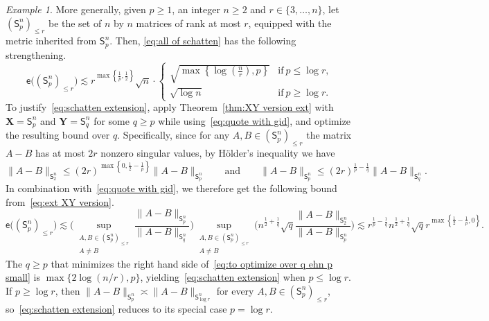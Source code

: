 \documentclass[11pt,reqno]{amsart}
\renewcommand{\le}{\leqslant}
\renewcommand{\ge}{\geqslant}
\newcommand{\X}{\mathbf X}
\newcommand{\Y}{\mathbf Y}
\theoremstyle{remark}
\newtheorem{example}[theorem]{Example}
\newcommand{\sfS}{\mathsf{S}}
\newcommand{\A}{\mathsf{A}}
\newcommand{\ee}{\mathsf{e}}
\renewcommand{\1}{\mathbf 1}
\begin{document}
\begin{example}
More generally, given $p\ge 1$, an integer $n\ge 2$ and $r\in \{3,\ldots,n\}$, let $(\sfS_p^n)_{\le r}$ be the set of $n$ by $n$ matrices of rank at most $r$, equipped with the metric  inherited from $\sfS_p^n$. Then, \eqref{eq:all of schatten} has the following strengthening.
\begin{equation}\label{eq:schatten extension}
\ee\big((\sfS_p^{n})_{\le r}\big)\lesssim r^{\max\left\{\frac{1}{p},\frac12\right\}}\sqrt{n} \cdot \left\{\begin{array}{ll}\sqrt{\max\left\{\log\left(\frac{ n}{r}\right),p\right\}}&\mathrm{if}\ p\le \log r,\\
\sqrt{\log n}&\mathrm{if}\ p\ge \log r.\end{array}\right.
\end{equation}
To justify~\eqref{eq:schatten extension}, apply Theorem~\ref{thm:XY version ext} with $\X=\sfS_p^n$ and $\Y=\sfS_q^n$ for some $q\ge p$ while using~\eqref{eq:quote with gid}, and optimize the resulting bound over $q$. Specifically, since for any $A,B\in (\sfS_p^n)_{\le r}$ the matrix $A-B$ has at most $2r$ nonzero singular values,  by H\"older's inequality we have
$$
\|A-B\|_{\sfS_2^n}\le (2r)^{\max\left\{0,\frac12-\frac{1}{p}\right\}}\|A-B\|_{\sfS_p^n}\qquad\mathrm{and}\qquad \|A-B\|_{\sfS_p^n} \le (2r)^{\frac{1}{p}-\frac{1}{q}}\|A-B\|_{\sfS_q^n}.
$$
 In combination with~\eqref{eq:quote with gid}, we therefore get the following bound from~\eqref{eq:ext XY version}.
\begin{equation}\label{eq:to optimize over q ehn p small}
\ee\big((\sfS_p^n)_{\le r}\big)\lesssim \bigg( \sup_{\substack{A,B\in (\sfS_p^n)_{\le r}\\A\neq B}}\frac{\|A-B\|_{\sfS_p^n}}{\|A-B\|_{\sfS_q^n}}\bigg)\sup_{\substack{A,B\in (\sfS_p^n)_{\le r}\\A\neq B}} \bigg( n^{\frac12+\frac{1}{q}}\sqrt{q}\frac{\|A-B\|_{\sfS_2^n}}{\|A-B\|_{\sfS_p^n}}\bigg)\lesssim r^{\frac{1}{p}-\frac{1}{q}}n^{\frac12+\frac{1}{q}}\sqrt{q}r^{\max\left\{\frac{1}{2}-\frac{1}{p},0\right\}}.
\end{equation}
The $q\ge p$ that minimizes the right hand side of~\eqref{eq:to optimize over q ehn p small} is $\max\{2\log(n/r),p\}$, yielding~\eqref{eq:schatten extension} when $p\le \log r$. If $p\ge \log r$, then $\|A-B\|_{\sfS_p^n}\asymp \|A-B\|_{\sfS_{\log r}^n}$ for every $A,B\in (\sfS_p^n)_{\le r}$, so~\eqref{eq:schatten extension} reduces to its special case $p=\log r$.




\end{example}
\end{document}
